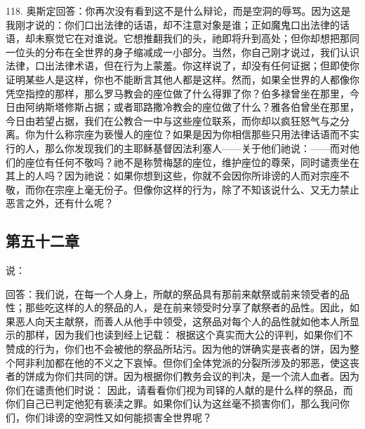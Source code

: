 118. 奥斯定回答：你再次没有看到这不是什么辩论，而是空洞的辱骂。因为这是我刚才说的：你们口出法律的话语，却不注意对象是谁；正如魔鬼口出法律的话语，却未察觉它在对谁说。它想推翻我们的头，祂即将升到高处；但你却想把那同一位头的分布在全世界的身子缩减成一小部分。当然，你自己刚才说过，我们认识法律，口出法律术语，但在行为上蒙羞。你这样说了，却没有任何证据；但即使你证明某些人是这样，你也不能断言其他人都是这样。然而，如果全世界的人都像你凭空指控的那样，那么罗马教会的座位做了什么得罪了你？伯多禄曾坐在那里，今日由阿纳斯塔修斯占据；或者耶路撒冷教会的座位做了什么？雅各伯曾坐在那里，今日由若望占据，我们在公教合一中与这些座位联系，而你却以疯狂怒气与之分离。你为什么称宗座为亵慢人的座位？如果是因为你相信那些只用法律话语而不实行的人，那么你发现我们的主耶稣基督因法利塞人——关于他们祂说：——而对他们的座位有任何不敬吗？祂不是称赞梅瑟的座位，维护座位的尊荣，同时谴责坐在其上的人吗？因为祂说：如果你想到这些，你就不会因你所诽谤的人而对宗座不敬，而你在宗座上毫无份子。但像你这样的行为，除了不知该说什么、又无力禁止恶言之外，还有什么呢？\par


\subsection{第五十二章}

 说：\par

 回答：我们说，在每一个人身上，所献的祭品具有那前来献祭或前来领受者的品性；那些吃这样的人的祭品的人，是在前来领受时分享了献祭者的品性。因此，如果恶人向天主献祭，而善人从他手中领受，这祭品对每个人的品性就如他本人所显示的那样，因为我们也读到经上记载： 根据这个真实而大公的评判，如果你们不赞成的行为，你们也不会被他的祭品所玷污。因为他的饼确实是丧者的饼，因为整个阿非利加都在他的不义之下哀悼。但你们全体党派的分裂所涉及的邪恶，使这丧者的饼成为你们共同的饼。因为根据你们教务会议的判决，是一个流人血者。因为你们在谴责他们时说： 因此，请看看你们视为司铎的人献的是什么样的祭品，而你们自己已判定他犯有亵渎之罪。如果你们认为这丝毫不损害你们，那么我问你们，你们诽谤的空洞性又如何能损害全世界呢？\par

